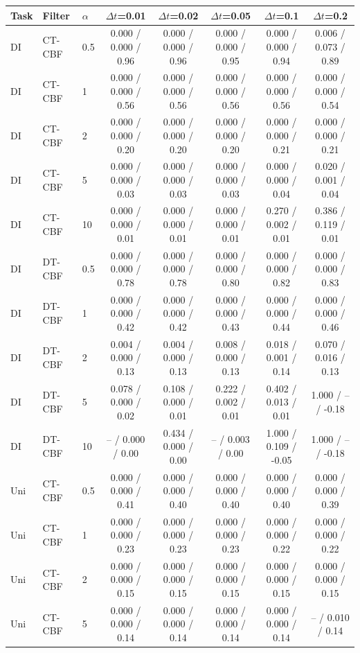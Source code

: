 \begin{tabular}{lllccccc}
\hline
Task & Filter & $\alpha$ & $\Delta t$=0.01 & $\Delta t$=0.02 & $\Delta t$=0.05 & $\Delta t$=0.1 & $\Delta t$=0.2 \\
\hline
DI & CT-CBF & 0.5 & 0.000 / 0.000 / 0.96 & 0.000 / 0.000 / 0.96 & 0.000 / 0.000 / 0.95 & 0.000 / 0.000 / 0.94 & 0.006 / 0.073 / 0.89 \\
DI & CT-CBF & 1 & 0.000 / 0.000 / 0.56 & 0.000 / 0.000 / 0.56 & 0.000 / 0.000 / 0.56 & 0.000 / 0.000 / 0.56 & 0.000 / 0.000 / 0.54 \\
DI & CT-CBF & 2 & 0.000 / 0.000 / 0.20 & 0.000 / 0.000 / 0.20 & 0.000 / 0.000 / 0.20 & 0.000 / 0.000 / 0.21 & 0.000 / 0.000 / 0.21 \\
DI & CT-CBF & 5 & 0.000 / 0.000 / 0.03 & 0.000 / 0.000 / 0.03 & 0.000 / 0.000 / 0.03 & 0.000 / 0.000 / 0.04 & 0.020 / 0.001 / 0.04 \\
DI & CT-CBF & 10 & 0.000 / 0.000 / 0.01 & 0.000 / 0.000 / 0.01 & 0.000 / 0.000 / 0.01 & 0.270 / 0.002 / 0.01 & 0.386 / 0.119 / 0.01 \\
\hline
DI & DT-CBF & 0.5 & 0.000 / 0.000 / 0.78 & 0.000 / 0.000 / 0.78 & 0.000 / 0.000 / 0.80 & 0.000 / 0.000 / 0.82 & 0.000 / 0.000 / 0.83 \\
DI & DT-CBF & 1 & 0.000 / 0.000 / 0.42 & 0.000 / 0.000 / 0.42 & 0.000 / 0.000 / 0.43 & 0.000 / 0.000 / 0.44 & 0.000 / 0.000 / 0.46 \\
DI & DT-CBF & 2 & 0.004 / 0.000 / 0.13 & 0.004 / 0.000 / 0.13 & 0.008 / 0.000 / 0.13 & 0.018 / 0.001 / 0.14 & 0.070 / 0.016 / 0.13 \\
DI & DT-CBF & 5 & 0.078 / 0.000 / 0.02 & 0.108 / 0.000 / 0.01 & 0.222 / 0.002 / 0.01 & 0.402 / 0.013 / 0.01 & 1.000 / -- / -0.18 \\
DI & DT-CBF & 10 & -- / 0.000 / 0.00 & 0.434 / 0.000 / 0.00 & -- / 0.003 / 0.00 & 1.000 / 0.109 / -0.05 & 1.000 / -- / -0.18 \\
\hline
Uni & CT-CBF & 0.5 & 0.000 / 0.000 / 0.41 & 0.000 / 0.000 / 0.40 & 0.000 / 0.000 / 0.40 & 0.000 / 0.000 / 0.40 & 0.000 / 0.000 / 0.39 \\
Uni & CT-CBF & 1 & 0.000 / 0.000 / 0.23 & 0.000 / 0.000 / 0.23 & 0.000 / 0.000 / 0.23 & 0.000 / 0.000 / 0.22 & 0.000 / 0.000 / 0.22 \\
Uni & CT-CBF & 2 & 0.000 / 0.000 / 0.15 & 0.000 / 0.000 / 0.15 & 0.000 / 0.000 / 0.15 & 0.000 / 0.000 / 0.15 & 0.000 / 0.000 / 0.15 \\
Uni & CT-CBF & 5 & 0.000 / 0.000 / 0.14 & 0.000 / 0.000 / 0.14 & 0.000 / 0.000 / 0.14 & 0.000 / 0.000 / 0.14 & -- / 0.010 / 0.14 \\

\end{tabular}
